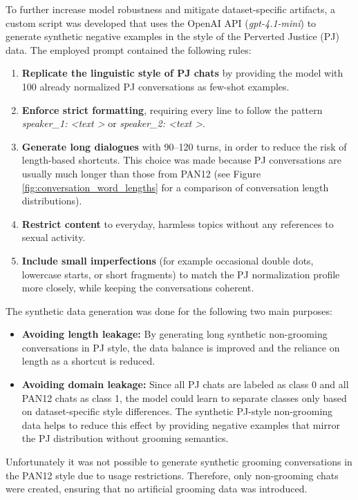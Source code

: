 To further increase model robustness and mitigate dataset-specific artifacts, a custom script was developed that  uses the OpenAI API (\textit{gpt-4.1-mini}) to generate synthetic negative examples in the style of the Perverted Justice (PJ) data. The employed prompt contained the following rules:
\begin{enumerate}
\item \textbf{Replicate the linguistic style of PJ chats} by providing the model with 100 already normalized PJ conversations as few-shot examples.
\item \textbf{Enforce strict formatting}, requiring every line to follow the pattern \textit{speaker\_1: \textless text \textgreater} or \textit{speaker\_2: \textless text \textgreater}.
\item \textbf{Generate long dialogues} with 90–120 turns, in order to reduce the risk of length-based shortcuts. This choice was made because PJ conversations are usually much longer than those from PAN12 (see Figure \ref{fig:conversation_word_lengths} for a comparison of conversation length distributions).
\item \textbf{Restrict content} to everyday, harmless topics without any references to sexual activity.
\item \textbf{Include small imperfections} (for example occasional double dots, lowercase starts, or short fragments) to match the PJ normalization profile more closely, while keeping the conversations coherent.
\end{enumerate}

The synthetic data generation was done for the following two main purposes:

\begin{itemize}
    \item \textbf{Avoiding length leakage:} By generating long synthetic non-grooming conversations in PJ style, the data balance is improved and the reliance on length as a shortcut is reduced.
    \item \textbf{Avoiding domain leakage:} Since all PJ chats are labeled as class 0 and all PAN12 chats as class 1, the model could learn to separate classes only based on dataset-specific style differences. The synthetic PJ-style non-grooming data helps to reduce this effect by providing negative examples that mirror the PJ distribution without grooming semantics.
\end{itemize}

Unfortunately it was not possible to generate synthetic grooming conversations in the PAN12 style due to usage restrictions. Therefore, only non-grooming chats were created, ensuring that no artificial grooming data was introduced.


